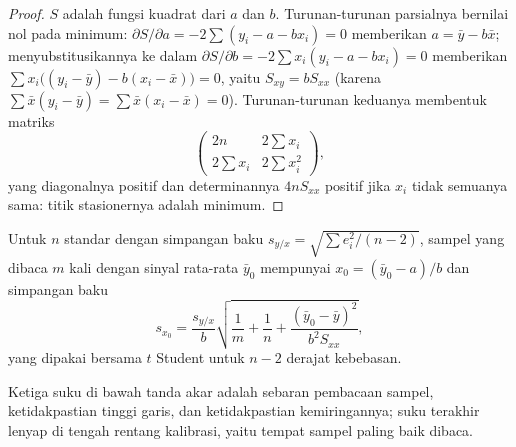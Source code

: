 \begin{proof}
$S$ adalah fungsi kuadrat dari $a$ dan $b$. Turunan-turunan parsialnya
bernilai nol pada minimum:
$\partial S/\partial a = -2\sum(y_i - a - bx_i) = 0$ memberikan $a = \bar y - b\bar x$; menyubstitusikannya ke dalam
$\partial S/\partial b = -2\sum x_i(y_i - a - bx_i) = 0$ memberikan $\sum x_i\bigl((y_i - \bar y) - b(x_i -
\bar x)\bigr) = 0$, yaitu $S_{xy} = bS_{xx}$ (karena $\sum \bar x(y_i - \bar y) = \sum \bar x(x_i - \bar
x) = 0$). Turunan-turunan keduanya membentuk matriks
\[\begin{pmatrix} 2n & 2\sum x_i\\ 2\sum x_i & 2\sum x_i^2\end{pmatrix},\]
yang diagonalnya positif dan determinannya $4nS_{xx}$ positif jika $x_i$
tidak semuanya sama: titik stasionernya adalah minimum.
\end{proof}

\begin{proposition}\label{prop:b2:measurement-statistics:interpolation}
Untuk $n$ standar dengan simpangan baku  $s_{y/x} = \sqrt{\sum e_i^2/(n-2)}$,
sampel yang dibaca
$m$ kali dengan sinyal rata-rata $\bar y_0$ mempunyai $x_0 = (\bar y_0 - a)/b$ dan simpangan baku
\begin{equation*}
s_{x_0} = \frac{s_{y/x}}{b}\sqrt{\frac1m + \frac1n + \frac{(\bar y_0 - \bar y)^2}{b^2S_{xx}}},
\end{equation*}
yang dipakai bersama $t$ Student untuk $n - 2$ derajat kebebasan.
\end{proposition}

\admitted

Ketiga suku di bawah tanda akar adalah sebaran pembacaan sampel,
ketidakpastian tinggi garis, dan ketidakpastian kemiringannya; suku
terakhir lenyap di tengah rentang kalibrasi, yaitu tempat sampel paling
baik dibaca.

